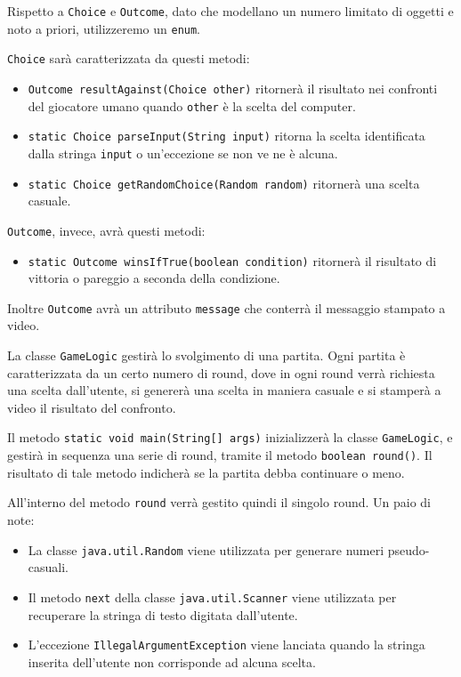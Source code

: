 \documentclass{article}
\begin{document}
Rispetto a \texttt{Choice} e \texttt{Outcome}, dato che modellano un numero limitato di oggetti e noto a priori,
utilizzeremo un \texttt{enum}.

\texttt{Choice} sarà caratterizzata da questi metodi:
\begin{itemize}
	\item \texttt{Outcome resultAgainst(Choice other)} ritornerà il risultato nei confronti del giocatore umano quando \texttt{other} è la scelta del computer.
	\item \texttt{static Choice parseInput(String input)} ritorna la scelta identificata dalla stringa \texttt{input} o un'eccezione
	se non ve ne è alcuna.
	\item \texttt{static Choice getRandomChoice(Random random)} ritornerà una scelta casuale.
\end{itemize}

\texttt{Outcome}, invece, avrà questi metodi:

\begin{itemize}
	\item \texttt{static Outcome winsIfTrue(boolean condition)} ritornerà il risultato di vittoria o pareggio a seconda della condizione.
\end{itemize}
Inoltre \texttt{Outcome} avrà un attributo \texttt{message} che conterrà il messaggio stampato a video.

La classe \texttt{GameLogic} gestirà lo svolgimento di una partita.
Ogni partita è caratterizzata da un certo numero di round, 
dove in ogni round verrà richiesta una scelta dall'utente, si genererà una scelta in maniera casuale
e si stamperà a video il risultato del confronto.

Il metodo \texttt{static void main(String[] args)} inizializzerà la classe \texttt{GameLogic},
e gestirà in sequenza una serie di round, tramite il metodo \texttt{boolean round()}.
Il risultato di tale metodo indicherà se la partita debba continuare o meno.

All'interno del metodo \texttt{round} verrà gestito quindi il singolo round.
Un paio di note:
\begin{itemize}
	\item La classe \texttt{java.util.Random} viene utilizzata per generare numeri pseudo-casuali.
	\item Il metodo \texttt{next} della classe \texttt{java.util.Scanner} viene utilizzata per recuperare la stringa di testo digitata
	dall'utente.
	\item L'eccezione \texttt{IllegalArgumentException} viene lanciata quando la stringa inserita dell'utente non corrisponde ad alcuna
	scelta.
\end{itemize}
\end{document}
